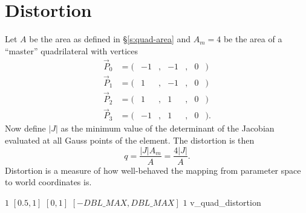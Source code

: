 \section{Distortion}

Let $A$ be the area as defined in \S\ref{s:quad-area}
and $A_m = 4$ be the area of a ``master'' quadrilateral with vertices
\[
\begin{array}{lcrcrcrl}
  \vec P_0 &= (&-1&,&-1&,& 0&)\\
  \vec P_1 &= (& 1&,&-1&,& 0&)\\
  \vec P_2 &= (& 1&,& 1&,& 0&)\\
  \vec P_3 &= (&-1&,& 1&,& 0&).
\end{array}
\]
Now define $|J|$ as the minimum value of the
determinant of the Jacobian evaluated at all Gauss points of the element.
The distortion is then
\[
q = \frac{|J| A_m}{A} = \frac{4|J|}{A}.
\]
Distortion is a measure of how well-behaved the mapping from
parameter space to world coordinates is.

%
{$1$}%
{$[0.5,1]$}%
{$[0,1]$}%
{$[-DBL\_MAX,DBL\_MAX]$}%
{$1$}%
{\cite{ideas:xx}}%
{v\_quad\_distortion}%


